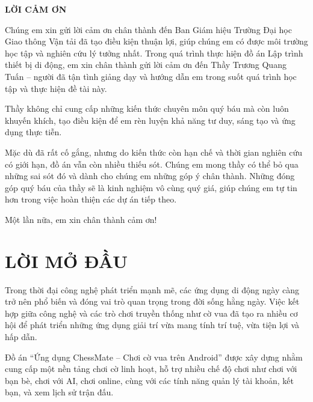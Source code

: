 \documentclass[a4paper,12pt]{article}
\begin{document}
\newpage %
\thispagestyle{empty} %

\begin{center}
    \textbf{\Large LỜI CẢM ƠN}
\end{center}

\onehalfspacing %

\justify %

\noindent Chúng em xin gửi lời cảm ơn chân thành đến Ban Giám hiệu Trường Đại học Giao thông Vận tải đã tạo điều kiện thuận lợi, giúp chúng em có được môi trường học tập và nghiên cứu lý tưởng nhất. Trong quá trình thực hiện đồ án Lập trình thiết bị di động, em xin chân thành gửi lời cảm ơn đến Thầy Trương Quang Tuấn – người đã tận tình giảng dạy và hướng dẫn em trong suốt quá trình học tập và thực hiện đề tài này.

\noindent Thầy không chỉ cung cấp những kiến thức chuyên môn quý báu mà còn luôn khuyến khích, tạo điều kiện để em rèn luyện khả năng tư duy, sáng tạo và ứng dụng thực tiễn.

\noindent Mặc dù đã rất cố gắng, nhưng do kiến thức còn hạn chế và thời gian nghiên cứu có giới hạn, đồ án vẫn còn nhiều thiếu sót. Chúng em mong thầy có thể bỏ qua những sai sót đó và dành cho chúng em những góp ý chân thành. Những đóng góp quý báu của thầy sẽ là kinh nghiệm vô cùng quý giá, giúp chúng em tự tin hơn trong việc hoàn thiện các dự án tiếp theo.

\noindent Một lần nữa, em xin chân thành cảm ơn!

\newpage %


\section*{\centering LỜI MỞ ĐẦU} %

\onehalfspacing
\justify
\noindent Trong thời đại công nghệ phát triển mạnh mẽ, các ứng dụng di động ngày càng trở nên phổ biến và đóng vai trò quan trọng trong đời sống hằng ngày. Việc kết hợp giữa công nghệ và các trò chơi truyền thống như cờ vua đã tạo ra nhiều cơ hội để phát triển những ứng dụng giải trí vừa mang tính trí tuệ, vừa tiện lợi và hấp dẫn.

\noindent Đồ án “Ứng dụng ChessMate – Chơi cờ vua trên Android” được xây dựng nhằm cung cấp một nền tảng chơi cờ linh hoạt, hỗ trợ nhiều chế độ chơi như chơi với bạn bè, chơi với AI, chơi online, cùng với các tính năng quản lý tài khoản, kết bạn, và xem lịch sử trận đấu.
\end{document}
